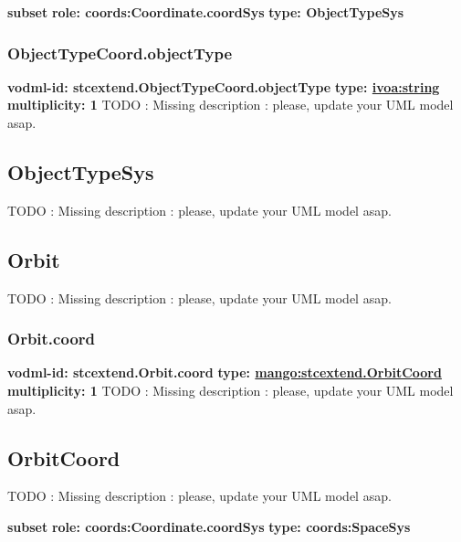     \noindent \textbf{subset} \newline
    \indent   \textbf{role: coords:Coordinate.coordSys} \newline
    \indent   \textbf{type: ObjectTypeSys} \newline


    \subsubsection{ObjectTypeCoord.objectType}
      \textbf{vodml-id: stcextend.ObjectTypeCoord.objectType} \newline
      \textbf{type: \hyperref[sect:ivoa]{ivoa:string}} \newline
      \textbf{multiplicity: 1} \newline 
      TODO : Missing description : please, update your UML model asap.

  \subsection{ObjectTypeSys}
  \label{sect:stcextend.ObjectTypeSys}
    TODO : Missing description : please, update your UML model asap.

  \subsection{Orbit}
  \label{sect:stcextend.Orbit}
    TODO : Missing description : please, update your UML model asap.

    \subsubsection{Orbit.coord}
      \textbf{vodml-id: stcextend.Orbit.coord} \newline
      \textbf{type: \hyperref[sect:stcextend.OrbitCoord]{mango:stcextend.OrbitCoord}} \newline
      \textbf{multiplicity: 1} \newline 
      TODO : Missing description : please, update your UML model asap.

  \subsection{OrbitCoord}
  \label{sect:stcextend.OrbitCoord}
    TODO : Missing description : please, update your UML model asap.

    \noindent \textbf{subset} \newline
    \indent   \textbf{role: coords:Coordinate.coordSys} \newline
    \indent   \textbf{type: coords:SpaceSys} \newline


